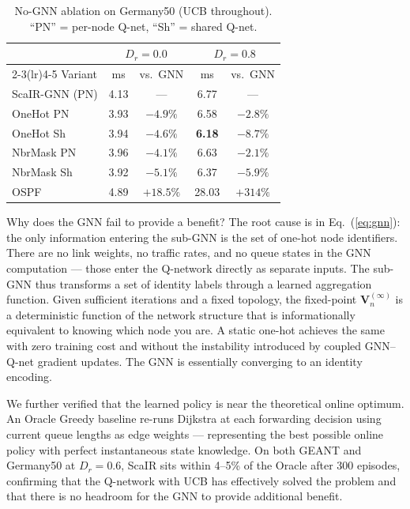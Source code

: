\documentclass[10pt,twocolumn,letterpaper]{article}
\begin{document}
\begin{table}[t]
\centering
\caption{No-GNN ablation on Germany50 (UCB throughout).
``PN'' = per-node Q-net, ``Sh'' = shared Q-net.}
\label{tab:ablation}
\small
\begin{tabular}{lcccc}
\toprule
 & \multicolumn{2}{c}{$D_r = 0.0$} &
   \multicolumn{2}{c}{$D_r = 0.8$} \\
\cmidrule(lr){2-3}\cmidrule(lr){4-5}
Variant & ms & vs.\ GNN & ms & vs.\ GNN \\
\midrule
ScaIR-GNN (PN) & 4.13 & --- & 6.77 & --- \\
\midrule
OneHot PN    & 3.93 & $-4.9\%$ & 6.58 & $-2.8\%$ \\
OneHot Sh    & 3.94 & $-4.6\%$ & \textbf{6.18} & $-8.7\%$ \\
NbrMask PN   & 3.96 & $-4.1\%$ & 6.63 & $-2.1\%$ \\
NbrMask Sh   & 3.92 & $-5.1\%$ & 6.37 & $-5.9\%$ \\
\midrule
OSPF & 4.89 & $+18.5\%$ & 28.03 & $+314\%$ \\
\bottomrule
\end{tabular}
\end{table}

Why does the GNN fail to provide a benefit? The root cause is in
Eq.~(\ref{eq:gnn}): the only information entering the sub-GNN is the
set of one-hot node identifiers. There are no link weights, no traffic
rates, and no queue states in the GNN computation — those enter the
Q-network directly as separate inputs. The sub-GNN thus transforms a
set of identity labels through a learned aggregation function. Given
sufficient iterations and a fixed topology, the fixed-point
$\mathbf{V}_n^{(\infty)}$ is a deterministic function of the network
structure that is informationally equivalent to knowing which node you
are. A static one-hot achieves the same with zero training cost and
without the instability introduced by coupled GNN--Q-net gradient
updates. The GNN is essentially converging to an identity encoding.

We further verified that the learned policy is near the theoretical
online optimum. An Oracle Greedy baseline re-runs Dijkstra at each
forwarding decision using current queue lengths as edge weights —
representing the best possible online policy with perfect instantaneous
state knowledge. On both GEANT and Germany50 at $D_r = 0.6$, ScaIR
sits within 4--5\% of the Oracle after 300 episodes, confirming that
the Q-network with UCB has effectively solved the problem and that there
is no headroom for the GNN to provide additional benefit.
\end{document}
